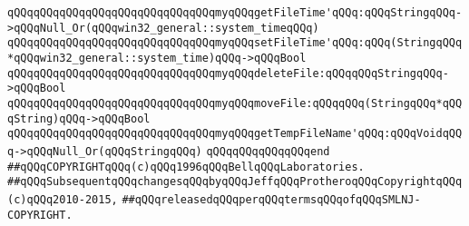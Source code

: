 \newline
\verb|qQQqqQQqqQQqqQQqqQQqqQQqqQQqqQQqmyqQQqgetFileTime'qQQq:qQQqStringqQQq->qQQqNull_Or(qQQqwin32_general::system_timeqQQq)|\newline
\verb|qQQqqQQqqQQqqQQqqQQqqQQqqQQqqQQqmyqQQqsetFileTime'qQQq:qQQq(StringqQQq*qQQqwin32_general::system_time)qQQq->qQQqBool|\newline
\newline
\verb|qQQqqQQqqQQqqQQqqQQqqQQqqQQqqQQqmyqQQqdeleteFile:qQQqqQQqStringqQQq->qQQqBool|\newline
\verb|qQQqqQQqqQQqqQQqqQQqqQQqqQQqqQQqmyqQQqmoveFile:qQQqqQQq(StringqQQq*qQQqString)qQQq->qQQqBool|\newline
\newline
\verb|qQQqqQQqqQQqqQQqqQQqqQQqqQQqqQQqmyqQQqgetTempFileName'qQQq:qQQqVoidqQQq->qQQqNull_Or(qQQqStringqQQq)|\newline
\verb|qQQqqQQqqQQqqQQqend|\newline
\newline
\newline
\newline
\verb|##qQQqCOPYRIGHTqQQq(c)qQQq1996qQQqBellqQQqLaboratories.|\newline
\verb|##qQQqSubsequentqQQqchangesqQQqbyqQQqJeffqQQqProtheroqQQqCopyrightqQQq(c)qQQq2010-2015,|\newline
\verb|##qQQqreleasedqQQqperqQQqtermsqQQqofqQQqSMLNJ-COPYRIGHT.|\newline


